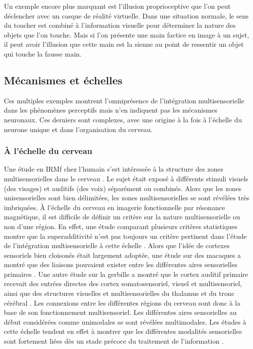 Un exemple encore plus marquant est l'illusion proprioceptive que l'on peut déclencher avec un casque de réalité virtuelle. Dans une situation normale, le sens du toucher est combiné à l'information visuelle pour déterminer la nature des objets que l'on touche. Mais si l'on présente une main factice en image à un sujet, il peut avoir l'illusion que cette main est la sienne au point de ressentir un objet qui touche la fausse main.

\subsection{Mécanismes et échelles}

Ces multiples exemples montrent l'omniprésence de l'intégration multisensorielle dans les phénomènes perceptifs mais n'en indiquent pas les mécanismes neuronaux. Ces derniers sont complexes, avec une origine à la fois à l'échelle du neurone unique et dans l'organisation du cerveau.

\subsubsection{À l'échelle du cerveau}

Une étude en IRMf chez l'humain s'est intéressée à la structure des zones multisensorielles dans le cerveau \cite{beauchamp_unraveling_2004}. Le sujet était exposé à différents stimuli visuels (des visages) et auditifs (des voix) séparément ou combinés. Alors que les zones unisensorielles sont bien délimitées, les zones multisensorielles se sont révélées très imbriquées.
À l'échelle du cerveau en imagerie fonctionnelle par résonance magnétique, il est difficile de définir un critère sur la nature multisensorielle ou non d'une région. En effet, une étude comparant plusieurs critères statistiques montre que la superadditivité n'est pas toujours un critère pertinent dans l'étude de l'intégration multisensorielle à cette échelle \cite{beauchamp_statistical_2005}.
Alors que l'idée de cortexes sensoriels bien cloisonés était largement adoptée, une étude sur des macaques a montré que des liaisons pouvaient exister entre les différentes aires sensorielles primaires \cite{brosch_nonauditory_2005}. Une autre étude sur la gerbille a montré que le cortex auditif primaire recevait des entrées directes des cortex somatosensoriel, visuel et multisensoriel, ainsi que des structures visuelles et multisensorielles du thalamus et du tronc cérébral \cite{budinger_multisensory_2006}.
Les connexions entre les différentes régions du cerveau sont donc à la base de son fonctionnement multisensoriel. Les différentes aires sensorielles au début considérées comme unimodales se sont révélées multimodales. Les études à cette échelle tendent en effet à montrer que les différentes modalités sensorielles sont fortement liées dès un stade précoce du traitement de l'information \cite{stein_multisensory_2008}.

